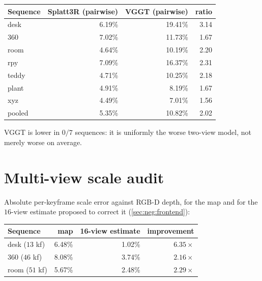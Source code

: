 \begin{center}
\small
\begin{tabular}{@{}lrrr@{}}
\toprule
Sequence & Splatt3R (pairwise) & VGGT (pairwise) & ratio \\
\midrule
desk   & 6.19\% & 19.41\% & 3.14 \\
360    & 7.02\% & 11.73\% & 1.67 \\
room   & 4.64\% & 10.19\% & 2.20 \\
rpy    & 7.09\% & 16.37\% & 2.31 \\
teddy  & 4.71\% & 10.25\% & 2.18 \\
plant  & 4.91\% & \phantom{0}8.19\% & 1.67 \\
xyz    & 4.49\% & \phantom{0}7.01\% & 1.56 \\
\midrule
pooled & 5.35\% & 10.82\% & 2.02 \\
\bottomrule
\end{tabular}
\end{center}

\noindent
VGGT is lower in $0/7$ sequences: it is uniformly the worse two-view model,
not merely worse on average.

\section{Multi-view scale audit}

Absolute per-keyframe scale error against RGB-D depth, for the map and for the
$16$-view estimate proposed to correct it (\cref{sec:neg:frontend}):

\begin{center}
\small
\begin{tabular}{@{}lrrr@{}}
\toprule
Sequence & map & 16-view estimate & improvement \\
\midrule
desk ($13$ kf) & 6.48\% & 1.02\% & $6.35\times$ \\
360  ($46$ kf) & 8.08\% & 3.74\% & $2.16\times$ \\
room ($51$ kf) & 5.67\% & 2.48\% & $2.29\times$ \\
\bottomrule
\end{tabular}
\end{center}
